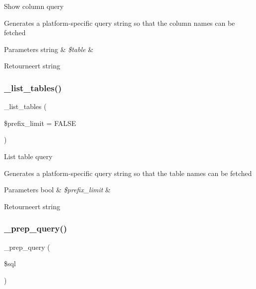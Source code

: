 Show column query

Generates a platform-\/specific query string so that the column names can be fetched


\begin{DoxyParams}[1]{Parameters}
string & {\em \$table} & \\
\hline
\end{DoxyParams}
\begin{DoxyReturn}{Retourneert}
string 
\end{DoxyReturn}
\mbox{\label{class_c_i___d_b__mysql__driver_a435c0f3ce54fe7daa178baa8532ebd54}} 
\subsubsection{\texorpdfstring{\_list\_tables()}{\_list\_tables()}}
{\footnotesize\ttfamily \+\_\+list\+\_\+tables (\begin{DoxyParamCaption}\item[{}]{\$prefix\+\_\+limit = {\ttfamily FALSE} }\end{DoxyParamCaption})\hspace{0.3cm}{\ttfamily [protected]}}

List table query

Generates a platform-\/specific query string so that the table names can be fetched


\begin{DoxyParams}[1]{Parameters}
bool & {\em \$prefix\+\_\+limit} & \\
\hline
\end{DoxyParams}
\begin{DoxyReturn}{Retourneert}
string 
\end{DoxyReturn}
\mbox{\label{class_c_i___d_b__mysql__driver_a86af88ef0fa6d44ab4691e3f53270339}} 
\subsubsection{\texorpdfstring{\_prep\_query()}{\_prep\_query()}}
{\footnotesize\ttfamily \+\_\+prep\+\_\+query (\begin{DoxyParamCaption}\item[{}]{\$sql }\end{DoxyParamCaption})\hspace{0.3cm}{\ttfamily [protected]}}

